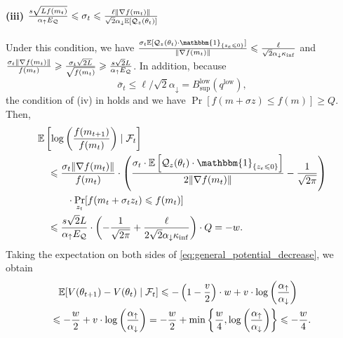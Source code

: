 \documentclass[journal]{IEEEtran}
\providecommand{\E}{\mathbb{E}} %
\providecommand{\ind}[1]{\ensuremath{\mathbbm{1}_{\left\{#1\right\}}}} %
\renewcommand{\geq}{\geqslant} %
\renewcommand{\leq}{\leqslant} %
\DeclarePairedDelimiter{\norm}{\lVert}{\rVert}
\theoremstyle{definition}
\newcommand{\aup}{\alpha_{\uparrow}}
\newcommand{\adown}{\alpha_{\downarrow}}
\begin{document}
\paragraph*{(iii) $\frac{s\sqrt{L f(m_t)}}{\aup E_\mathcal{Q}}\leq\sigma_t\leq\frac{\ell \norm{\nabla f(m_t)}}{\sqrt{2}\adown \E[\mathcal{Q}_z(\theta_t)]}$}
Under this condition, we have
$\frac{\sigma_t \E[\mathcal{Q}_z(\theta_t)\cdot\ind{z_e\leq 0}]}{\norm{\nabla f(m_t)}}\leq \frac{\ell}{\sqrt{2}\adown \kappa_{\inf}}$
and
$\frac{\sigma_t \norm{\nabla f(m_t)}}{f(m_t)}\geq \frac{\sigma_t \sqrt{2L}}{\sqrt{f(m_t)}}\geq \frac{s\sqrt{2} L}{\aup E_\mathcal{Q}}$.
In addition, because
\begin{equation}
\bar\sigma_t
\leq
\ell / \sqrt{2}\adown = B_{\sup}^\mathrm{low}(q^\mathrm{low}),
\end{equation}
the condition of (iv) in  holds and we have $\Pr[f(m + \sigma z) \leq f(m) ]\geq Q$.
Then,
\begin{equation}
\begin{split}
\MoveEqLeft[1] 
\E\left[ \log\left(\frac{f(m_{t+1})}{f(m_t)}\right)  \mid \mathcal{F}_t \right]
\\
&\leq
\frac{\sigma_t \norm{\nabla f(m_t)}}{f(m_t)}\cdot\left(
\frac{\sigma_t \cdot \E\left[\mathcal{Q}_z(\theta_t)\cdot \ind{z_e\leq 0} \right] }{2\norm{\nabla f(m_t)}}
- \frac{1}{\sqrt{2\pi}}
\right)
\\
&\qquad \cdot \Pr_{z_t}[f(m_t + \sigma_t z_t) \leq f(m_t) ]
\\
&\leq
\frac{s\sqrt{2} L}{\aup E_\mathcal{Q}}
\cdot\left(
- \frac{1}{\sqrt{2\pi}}
+ \frac{\ell}{2\sqrt{2}\adown \kappa_{\inf}}
\right)
\cdot Q
= 
- w 
.
\end{split}
\end{equation}
Taking the expectation on both sides of \eqref{eq:general_potential_decrease}, we obtain
\begin{multline}
\hspace{-0.8em}
\E[ V(\theta_{t+1}) - V(\theta_t)\mid \mathcal{F}_t ]
\leq - \left(1-\frac{v}{2}\right) \cdot w + v\cdot\log\left(\frac{\aup}{\adown}\right)
\\
\leq - \frac{w}{2} + v\cdot\log\left(\frac{\aup}{\adown}\right)
= - \frac{w}{2} + \min \left\{ \frac{w}{4}, \log\left(\frac{\aup}{\adown}\right) \right\}
\leq - \frac{w}{4} .
\label{eq:reasonable_expected_potential_decrease}
\end{multline}
\end{document}
